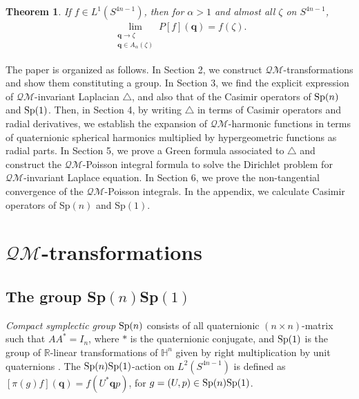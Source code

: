 \documentclass[a4paper,11pt]{amsart}
\numberwithin{equation}{section}
\newtheorem{thm}{Theorem}[section]
\begin{document}
\begin{thm}\label{Fatou}
\;If $f\in L^1(S^{4n-1})$, then for $\alpha>1$ and almost all $\zeta$ on $S^{4n-1}$,
\begin{equation}\begin{aligned}\label{nontan lim}
\lim_{\substack{\mathbf{q}\rightarrow\zeta\\ \mathbf{q}\in A_{\alpha}(\zeta)}} P[f](\mathbf{q})=f(\zeta).
\end{aligned}\end{equation}


\end{thm}


  The paper is organized as follows. In Section 2, we construct $\mathcal{QM}$-transformations and show them constituting a group. In Section 3, we find the explicit expression of $\mathcal{QM}$-invariant Laplacian $\triangle$, and also that of the Casimir operators of ${\rm Sp}(n)$ and ${\rm Sp}(1)$. Then, in Section 4, by writing $\triangle$ in terms of Casimir operators and radial derivatives, we establish the expansion of $\mathcal{QM}$-harmonic functions in terms of quaternionic spherical harmonics multiplied by hypergeometric functions as radial parts. In Section 5, we prove a Green formula associated to $\triangle$ and construct the $\mathcal{QM}$-Poisson integral formula to solve the Dirichlet problem for $\mathcal{QM}$-invariant Laplace equation. In Section 6, we prove the non-tangential convergence of the $\mathcal{QM}$-Poisson integrals. In the appendix, we calculate Casimir operators of Sp$(n)$ and Sp$(1)$.

\section{$\mathcal{QM}$-transformations}


\subsection{The group  Sp$(n)$Sp$(1)$}
{\it Compact symplectic group} ${\rm Sp}(n)$ consists of all quaternionic $(n\times n)$-matrix such that $AA^*=I_n$, where $*$ is the quaternionic conjugate, and ${\rm Sp}(1)$ is the group of $\mathbb{R}$-linear transformations of $\mathbb{H}^n$ given by right multiplication by unit quaternions \cite{Co}. The ${\rm Sp}(n){\rm Sp}(1)$-action on $L^2(S^{4n-1})$ is defined as $[\pi(g)f](\mathbf{q})=f(U^*\mathbf{q}p)$, for $g=(U,p)\in {\rm Sp}(n){\rm Sp}(1)$.
\end{document}
